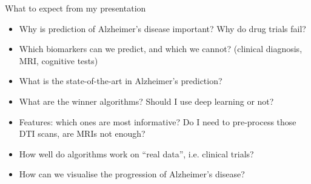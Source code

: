 \documentclass[8pt,xcolor=table,aspectratio=169]{beamer}
\begin{document}
\begin{frame}{What to expect from my presentation}
 
 \begin{itemize}
 
   \item Why is prediction of Alzheimer's disease important? Why do drug trials fail?
  
  \vspace{2em}
  
   \item Which biomarkers can we predict, and which we cannot? (clinical diagnosis, MRI, cognitive tests)
  
  \vspace{2em}
  
   \item What is the state-of-the-art in Alzheimer's prediction?
  
  \vspace{2em}
  
   \item What are the winner algorithms? Should I use deep learning or not?
  
  \vspace{2em}
   
   \item Features: which ones are most informative? Do I need to pre-process those DTI scans, are MRIs not enough?
  
  \vspace{2em}
  
   \item How well do algorithms work on ``real data'', i.e. clinical trials?
  
  \vspace{2em}
  
   \item How can we visualise the progression of Alzheimer's disease? 
  
 \end{itemize}

\end{frame}
\end{document}
